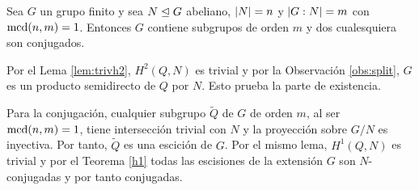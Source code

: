 \begin{teorema}\label{thmschurab} Sea $G$ un grupo finito y sea $N \trianglelefteq G$ abeliano, $\left|N\right|=n$ y $\left|G:N\right|=m$ con $\operatorname{mcd}(n,m)=1$. Entonces $G$ contiene subgrupos de orden $m$ y dos cualesquiera son conjugados.
	\begin{demostracion}
%		
%		

		Por el Lema \ref{lem:trivh2}, $H^2(Q,N)$ es trivial y por la Observación \ref{obs:split}, $G$ es un producto semidirecto de $Q$ por $N$. Esto prueba la parte de existencia.
		
		Para la conjugación, cualquier subgrupo $\tilde Q$ de $G$ de orden $m$, al ser $\operatorname{mcd}(n,m)=1$, tiene intersección trivial con $N$ y la proyección sobre $G/N$ es inyectiva. Por tanto, $\tilde Q$ es una escición de $G$. Por el mismo lema, $H^1(Q,N)$ es trivial y por el Teorema \ref{h1} todas las escisiones de la extensión $G$ son $N$-conjugadas y por tanto conjugadas. 
	\end{demostracion}
\end{teorema}